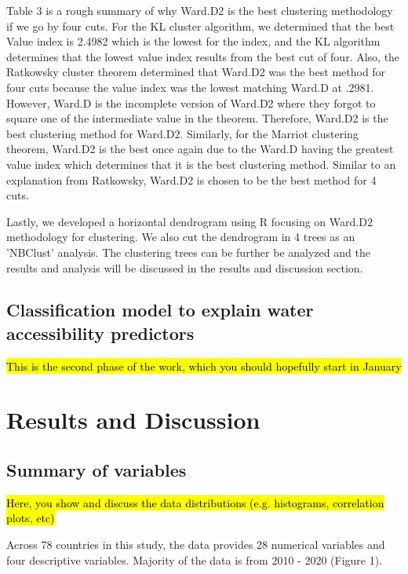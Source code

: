 \documentclass[10pt,twoside]{article}
\numberwithin{equation}{section}
\newcommand{\?}{\stackrel{?}{=}}
\begin{document}
Table 3 is a rough summary of why Ward.D2 is the best clustering methodology if we go by four cuts. For the KL cluster algorithm, we determined that the best Value index is 2.4982 which is the lowest for the index, and the KL algorithm determines that the lowest value index results from the best cut of four. Also, the Ratkowsky cluster theorem determined that Ward.D2 was the best method for four cuts because the value index was the lowest matching Ward.D at .2981. However, Ward.D is the incomplete version of Ward.D2 where they forgot to square one of the intermediate value in the theorem. Therefore, Ward.D2 is the best clustering method for Ward.D2. Similarly, for the Marriot clustering theorem, Ward.D2 is the best once again due to the Ward.D having the greatest value index which determines that it is the best clustering method. Similar to an explanation from Ratkowsky, Ward.D2 is chosen to be the best method for 4 cuts.

Lastly, we developed a horizontal dendrogram using R focusing on Ward.D2 methodology for clustering. We also cut the dendrogram in 4 trees as an 'NBClust' analysis. The clustering trees can be further be analyzed and the results and analysis will be discussed in the results and discussion section. 



\subsection*{Classification model to explain water accessibility predictors}
\hl{This is the second phase of the work, which you should hopefully start in January}


\section*{Results and Discussion}
\subsection*{Summary of variables}
\hl{Here, you show and discuss the data distributions (e.g. histograms, correlation plots, etc)}

Across 78 countries in this study, the data provides 28 numerical variables and four descriptive variables. Majority of the data is from 2010 - 2020 (Figure 1).
\end{document}
